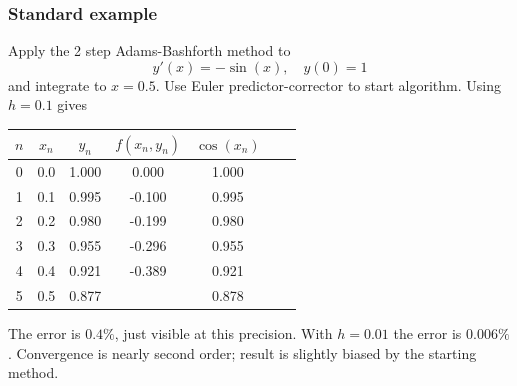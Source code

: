 \documentclass{beamer}
\begin{document}
\begin{frame}
  \frametitle{Standard example}

  Apply the 2 step Adams-Bashforth method to
  \begin{equation*}
    y'(x) = - \sin(x), \quad y(0) = 1
  \end{equation*}
  and integrate to $x = 0.5$. Use Euler predictor-corrector to start
  algorithm. Using $h = 0.1$ gives
  \begin{center}
    \begin{tabular}{c|c c c c c c}
      $n$ & $x_n$ & $y_n$ & $f(x_n, y_n)$ & $\cos(x_n)$ \\
      \hline
      0 & 0.0 & 1.000 &  0.000 & 1.000 \\
      1 & 0.1 & 0.995 & -0.100 & 0.995 \\
      2 & 0.2 & 0.980 & -0.199 & 0.980 \\
      3 & 0.3 & 0.955 & -0.296 & 0.955 \\
      4 & 0.4 & 0.921 & -0.389 & 0.921 \\
      5 & 0.5 & 0.877 &        & 0.878
    \end{tabular}
  \end{center} \pause
  The error is $0.4\%$, just visible at this precision. With $h =
  0.01$ the error is $0.006\%$.  Convergence is nearly second order;
  result is slightly biased by the starting method.

\end{frame}
\end{document}
